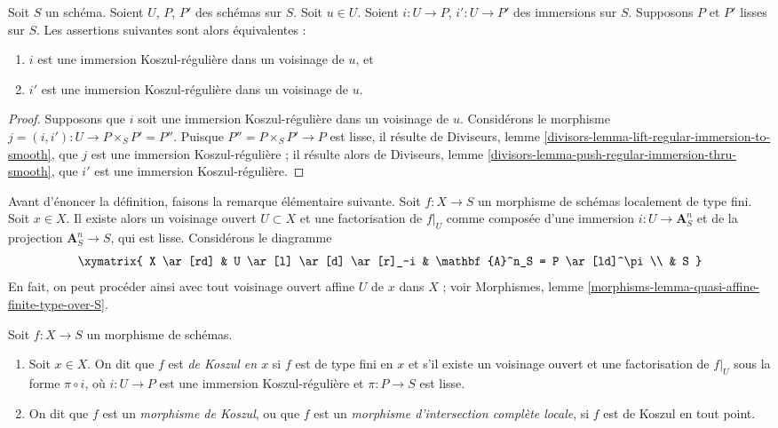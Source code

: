 \begin{lemma}
\label{lemma-koszul-independence-factorization}
Soit $S$ un schéma. Soient $U$, $P$, $P'$ des schémas sur $S$.
Soit $u \in U$. Soient $i : U \to P$, $i' : U \to P'$ des immersions sur $S$.
Supposons $P$ et $P'$ lisses sur $S$. Les assertions suivantes sont alors équivalentes :
\begin{enumerate}
\item $i$ est une immersion Koszul-régulière dans un voisinage de $u$, et
\item $i'$ est une immersion Koszul-régulière dans un voisinage de $u$.
\end{enumerate}
\end{lemma}

\begin{proof}
Supposons que $i$ soit une immersion Koszul-régulière dans un voisinage de $u$.
Considérons le morphisme $j = (i, i') : U \to P \times_S P' = P''$.
Puisque $P'' = P \times_S P' \to P$ est lisse, il résulte de
Diviseurs, lemme \ref{divisors-lemma-lift-regular-immersion-to-smooth},
que $j$ est une immersion Koszul-régulière ; il résulte alors de
Diviseurs, lemme \ref{divisors-lemma-push-regular-immersion-thru-smooth},
que $i'$ est une immersion Koszul-régulière.
\end{proof}

\noindent
Avant d'énoncer la définition, faisons la remarque élémentaire
suivante. Soit $f : X \to S$ un morphisme de schémas localement
de type fini. Soit $x \in X$. Il existe alors un voisinage ouvert
$U \subset X$ et une factorisation de $f|_U$ comme composée d'une
immersion $i : U \to \mathbf{A}^n_S$ et de la projection
$\mathbf{A}^n_S \to S$, qui est lisse. Considérons le diagramme
$$
\xymatrix{
X \ar[rd] & U \ar[l] \ar[d] \ar[r]_-i & \mathbf{A}^n_S = P \ar[ld]^\pi \\
& S
}
$$
En fait, on peut procéder ainsi avec tout voisinage ouvert affine
$U$ de $x$ dans $X$ ; voir
Morphismes, lemme \ref{morphisms-lemma-quasi-affine-finite-type-over-S}.

\begin{definition}
\label{definition-lci}
Soit $f : X \to S$ un morphisme de schémas.
\begin{enumerate}
\item Soit $x \in X$. On dit que $f$ est {\it de Koszul en $x$} si $f$
est de type fini en $x$ et s'il existe un voisinage ouvert
et une factorisation de $f|_U$ sous la forme $\pi \circ i$, où $i : U \to P$
est une immersion Koszul-régulière et $\pi : P \to S$ est lisse.
\item On dit que $f$ est un {\it morphisme de Koszul}, ou que
$f$ est un {\it morphisme d'intersection complète locale},
si $f$ est de Koszul en tout point.
\end{enumerate}
\end{definition}

